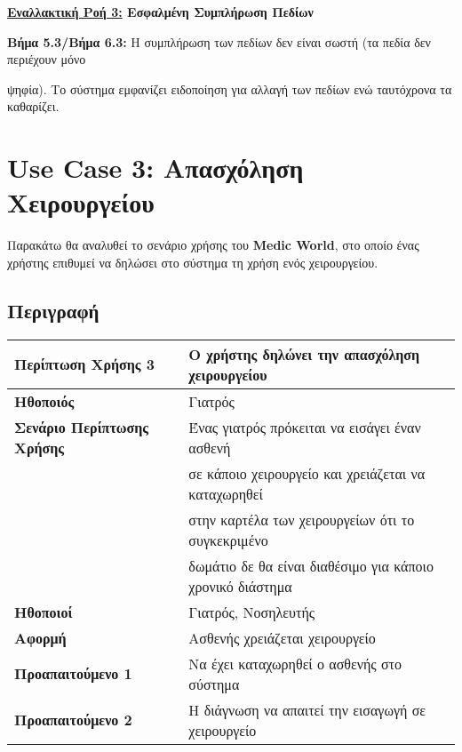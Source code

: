 \documentclass{article}
\newcommand\T{\rule{0pt}{2.6ex}}       %
\newcommand\B{\rule[-1.2ex]{0pt}{0pt}}
\begin{document}
\vspace{0.2cm}

\textbf{\underline{Εναλλακτική Ροή 3:} Εσφαλμένη Συμπλήρωση Πεδίων} \vspace{0.2cm} 
\par \textbf{Βήμα 5.3/Βήμα 6.3:} Η συμπλήρωση των πεδίων δεν είναι σωστή (τα πεδία δεν περιέχουν μόνο \par ψηφία). Το σύστημα εμφανίζει ειδοποίηση για αλλαγή των πεδίων ενώ ταυτόχρονα τα καθαρίζει.

 \section{Use Case 3: Απασχόληση Χειρουργείου}
 
 Παρακάτω θα αναλυθεί το σενάριο χρήσης του \textbf{Medic World}, στο οποίο ένας χρήστης επιθυμεί να δηλώσει στο σύστημα τη χρήση ενός χειρουργείου.

\subsection{Περιγραφή}

\begin{center}
     \begin{tabular}{|l|l|}
     \hline
      \textbf{Περίπτωση Χρήσης 3} & Ο χρήστης δηλώνει την απασχόληση χειρουργείου \T\B \\ 
      \hline
      \textbf{Ηθοποιός} & Γιατρός \T\B \\
      \hline
      \textbf{Σενάριο Περίπτωσης Χρήσης} & Ένας γιατρός πρόκειται να εισάγει έναν ασθενή \T \\& σε κάποιο χειρουργείο και χρειάζεται να καταχωρηθεί\\& στην καρτέλα των χειρουργείων ότι το συγκεκριμένο\\& δωμάτιο δε θα είναι διαθέσιμο για κάποιο χρονικό διάστημα \B \\
      \hline
      \textbf{Ηθοποιοί} & Γιατρός, Νοσηλευτής \T\B \\
      \hline
      \textbf{Αφορμή} & Ασθενής χρειάζεται χειρουργείο \T\B \\
      \hline
      \textbf{Προαπαιτούμενο 1} & Να έχει καταχωρηθεί ο ασθενής στο σύστημα \T\B \\
      \hline
      \textbf{Προαπαιτούμενο 2} & Η διάγνωση να απαιτεί την εισαγωγή σε χειρουργείο \T\B \\
      \hline
     \end{tabular}
 \end{center}
 
\end{document}
